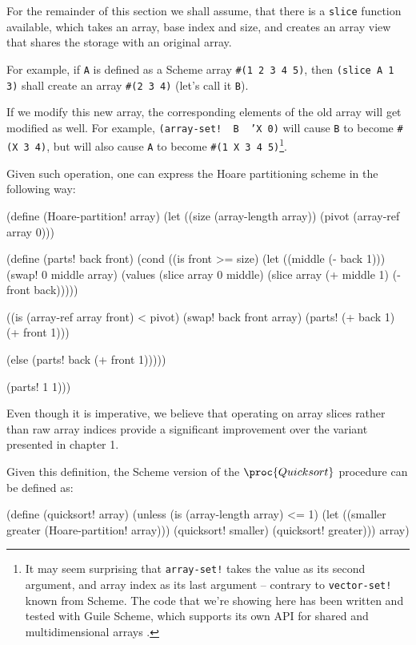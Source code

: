 For the remainder of this section we shall assume, that there is
a \texttt{slice} function available, which takes an array, base
index and size, and creates an array view that shares the storage
with an original array.

For example, if \texttt{A} is defined as a Scheme array \texttt{\#(1 2 3 4 5)},
then \texttt{(slice A 1 3)} shall create an array \texttt{\#(2 3 4)} (let's
call it \texttt{B}).

If we modify this new array, the corresponding elements of the old array
will get modified as well. For example, \texttt{(array-set!\,\,B\,\,'X 0)}
will cause \texttt{B} to become \texttt{\#(X 3 4)}, but will also cause
\texttt{A} to become \texttt{\#(1 X 3 4 5)}\footnote{
  It may seem surprising that \texttt{array-set!} takes the value as
  its second argument, and array index as its last argument -- contrary
  to \texttt{vector-set!} known from Scheme. The code that we're showing
  here has been written and tested with Guile Scheme, which supports
  its own API for shared and multidimensional arrays \cite{GuileReference}.
}.

Given such operation, one can express the Hoare partitioning scheme
in the following way:

\begin{Snippet}
(define (Hoare-partition! array)
  (let ((size (array-length array))
	(pivot (array-ref array 0)))
  
    (define (parts! back front)
      (cond ((is front >= size)
	     (let ((middle (- back 1)))
	       (swap! 0 middle array)
	       (values (slice array 0 middle)
                       (slice array (+ middle 1)
                                    (- front back)))))

	    ((is (array-ref array front) < pivot)
	     (swap! back front array)
	     (parts! (+ back 1) (+ front 1)))

	    (else
	     (parts! back (+ front 1)))))

    (parts! 1 1)))
\end{Snippet}

Even though it is imperative, we believe that operating on array slices
rather than raw array indices provide a significant improvement over the
variant presented in chapter 1.

Given this definition, the Scheme version of the $\proc{Quicksort}$
procedure can be defined as:

\begin{Snippet}
(define (quicksort! array)
  (unless (is (array-length array) <= 1)
    (let ((smaller greater (Hoare-partition! array)))
      (quicksort! smaller)
      (quicksort! greater)))
  array)
\end{Snippet}

